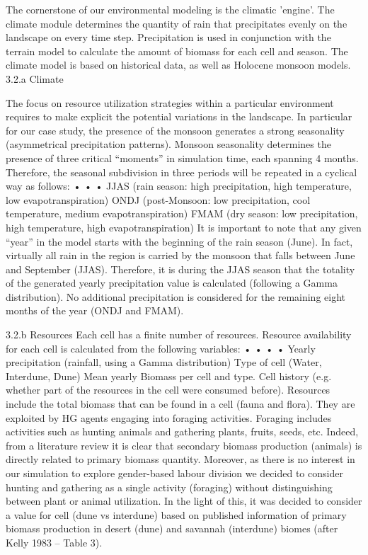 The cornerstone of our environmental modeling is the climatic 'engine'. The climate module
determines the quantity of rain that precipitates evenly on the landscape on every time step.
Precipitation is used in conjunction with the terrain model to calculate the amount of biomass for each
cell and season. The climate model is based on historical data, as well as Holocene monsoon models.
3.2.a Climate


The focus on resource utilization strategies within a particular environment requires to make explicit
the potential variations in the landscape. In particular for our case study, the presence of the monsoon
generates a strong seasonality (asymmetrical precipitation patterns).
Monsoon seasonality determines the presence of three critical “moments” in simulation time, each
spanning 4 months. Therefore, the seasonal subdivision in three periods will be repeated in a cyclical
way as follows:
•
•
•
JJAS (rain season: high precipitation, high temperature, low evapotranspiration)
ONDJ (post-Monsoon: low precipitation, cool temperature, medium evapotranspiration)
FMAM (dry season: low precipitation, high temperature, high evapotranspiration)
It is important to note that any given “year” in the model starts with the beginning of the rain season
(June). In fact, virtually all rain in the region is carried by the monsoon that falls between June and
September (JJAS). Therefore, it is during the JJAS season that the totality of the generated yearly
precipitation value is calculated (following a Gamma distribution). No additional precipitation is
considered for the remaining eight months of the year (ONDJ and FMAM).


3.2.b
Resources
Each cell has a finite number of resources. Resource availability for each cell is calculated from the
following variables:
•
•
•
•
Yearly precipitation (rainfall, using a Gamma distribution)
Type of cell (Water, Interdune, Dune)
Mean yearly Biomass per cell and type.
Cell history (e.g. whether part of the resources in the cell were consumed before).
Resources include the total biomass that can be found in a cell (fauna and flora). They are exploited
by HG agents engaging into foraging activities. Foraging includes activities such as hunting animals
and gathering plants, fruits, seeds, etc. Indeed, from a literature review it is clear that secondary
biomass production (animals) is directly related to primary biomass quantity. Moreover, as there is no
interest in our simulation to explore gender-based labour division we decided to consider hunting and
gathering as a single activity (foraging) without distinguishing between plant or animal utilization. In the
light of this, it was decided to consider a value for cell (dune vs interdune) based on published
information of primary biomass production in desert (dune) and savannah (interdune) biomes (after
Kelly 1983 – Table 3).


